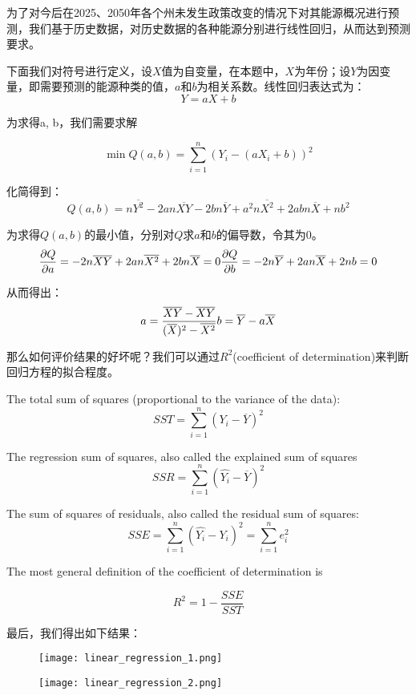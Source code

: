 \documentclass[a4paper]{ctexrep}
\begin{document}
为了对今后在2025、2050年各个州未发生政策改变的情况下对其能源概况进行预测，我们基于历史数据，对历史数据的各种能源分别进行线性回归，从而达到预测要求。

下面我们对符号进行定义，设$X$值为自变量，在本题中，$X$为年份；设$Y$为因变量，即需要预测的能源种类的值，$a$和$b$为相关系数。线性回归表达式为：
$$Y = aX+b$$

为求得a, b，我们需要求解

$$\min Q(a, b) = \sum_{i=1}^n(Y_i - (aX_i+b))^2$$

化简得到：
$$Q(a, b) = n\overline{Y^2} - 2an\overline{XY} - 2bn\overline Y + a^2n\overline{X^2} + 2abn\overline X + nb^2$$

为求得$Q(a, b)$的最小值，分别对$Q$求$a$和$b$的偏导数，令其为0。
$$
\frac{\partial Q}{\partial a} = -2n\overline{XY} + 2an\overline{X^2} + 2bn\overline X = 0\\
\frac{\partial Q}{\partial b} = -2n\overline Y  + 2an\overline X + 2nb = 0
$$

从而得出：
$$
a = \dfrac{\overline X \overline Y - \overline{XY}}{(\overline X)^2 - \overline{X^2}} \\
b = \overline Y - a\overline X
$$

那么如何评价结果的好坏呢？我们可以通过$R^2$(coefficient of determination)来判断回归方程的拟合程度。

The total sum of squares (proportional to the variance of the data):
$$SST = \sum_{i=1}^n(Y_i - \overline Y)^2$$

The regression sum of squares, also called the explained sum of squares
$$SSR = \sum_{i=1}^n (\hat {Y_i} - \overline Y)^2$$

The sum of squares of residuals, also called the residual sum of squares:
$$SSE = \sum_{i=1}^n (\hat {Y_i} - Y_i)^2 = \sum_{i=1}^n e_i^2$$

The most general definition of the coefficient of determination is

$$R^2 = 1 - \frac{SSE}{SST}$$

最后，我们得出如下结果：

\begin{figure}
	\centering
	\texttt{[image: linear\_regression\_1.png]}
\end{figure}

\begin{figure}
	\centering
	\texttt{[image: linear\_regression\_2.png]}
\end{figure}
\end{document}
